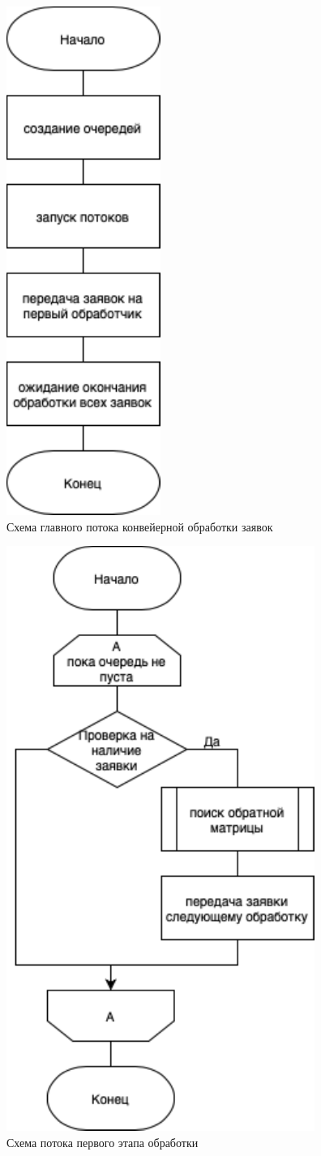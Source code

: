 \begin{figure}[h]
    \centering
    \includegraphics[width=0.3\linewidth]{img/pipOsn.pdf}
    \caption{Схема главного потока конвейерной обработки заявок}
    \label{fig:pipOsn}
\end{figure}

\begin{figure}[h]
    \centering
    \includegraphics[width=0.6\linewidth]{img/pip1.pdf}
    \caption{Схема потока первого этапа обработки}
    \label{fig:pip1}
\end{figure}

